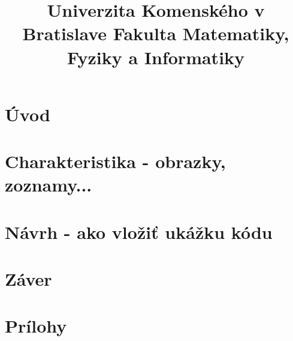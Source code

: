 \documentclass[12pt,a4paper]{bachelor}
\title{Univerzita Komenského v Bratislave Fakulta Matematiky, Fyziky a Informatiky}
\author{\autor}
\begin{document}



\tableofcontents
\newpage

\chapter{Úvod}


\chapter{Charakteristika - obrazky, zoznamy...}


\chapter{Návrh - ako vložiť ukážku kódu}


\chapter{Záver}

\printbibliography
{}  %


\chapter*{Prílohy}   %


\label{totalpages}
\end{document}
